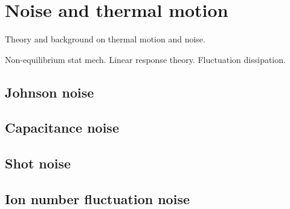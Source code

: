 \chapter{Noise and thermal motion}
\label{noise}

Theory and background on thermal motion and noise.

Non-equilibrium stat mech.  Linear response theory.  Fluctuation dissipation.

\section{Johnson noise}

\section{Capacitance noise}

\section{Shot noise}

\section{Ion number fluctuation noise}